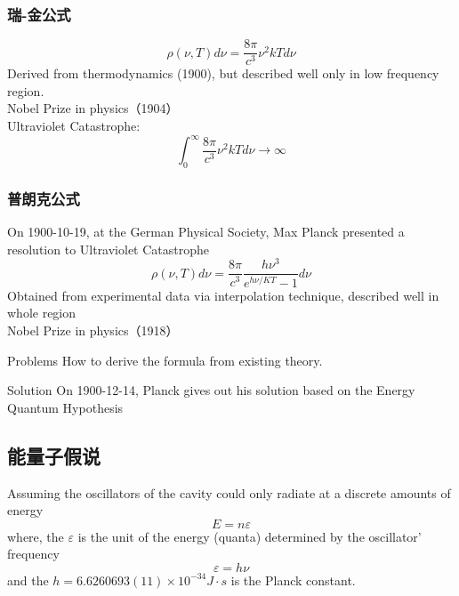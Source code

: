 \begin{frame}[t]
    \frametitle{瑞-金公式}
    \begin{equation*}
        \rho(\nu, T) d \nu=\frac{8 \pi}{c^{3}} \nu^{2} k T d \nu 
    \end{equation*}
    Derived from thermodynamics (1900), but described well only in low frequency region.\\ 
   {\color{deepred} Nobel Prize in physics（1904）}\\ \vspace{0.3em}
   {\color{deepblue} \bullet Ultraviolet Catastrophe:} 
    \begin{equation*}
         \int_0 ^\infty \frac{8 \pi}{c^{3}} \nu^{2} k T d \nu \to \infty 
    \end{equation*}
\end{frame}

\begin{frame}
    \frametitle{普朗克公式}
    On 1900-10-19, at the German Physical Society, 
    Max Planck presented a resolution to {\color{deepblue} Ultraviolet Catastrophe} 
    \begin{equation}
        \boxed{\rho(\nu, T) d \nu=\frac{8 \pi}{c^{3}} \frac{h \nu^{3}}{e^{h \nu / K T}-1} d \nu}
    \end{equation}
    Obtained from experimental data via interpolation technique, described well in whole region \\
    {\color{deepred} Nobel Prize in physics（1918）}\\
\end{frame}

\begin{frame}[t]
    \begin{tcolorbox1}{Problems}
        How to derive the formula from existing theory.
    \end{tcolorbox1}
    \begin{tcolorbox2}{Solution}
        On 1900-12-14, Planck gives out his solution based on the Energy Quantum Hypothesis  
    \end{tcolorbox2}
\end{frame}

\subsection{能量子假说}
\begin{frame}
    \begin{tcolorbox4}
    Assuming the oscillators of the cavity could only radiate at a discrete amounts of energy
    \begin{equation}
        E=n\varepsilon
    \end{equation}
    where, the $\varepsilon$ is the unit of the energy (quanta) determined by the oscillator' frequency 
    \begin{equation}
        \varepsilon=h\nu
    \end{equation}
    and the $h=6.6260693(11)\times10^{-34} J\cdot s $ is the Planck constant. 
    \end{tcolorbox4}
\end{frame}

